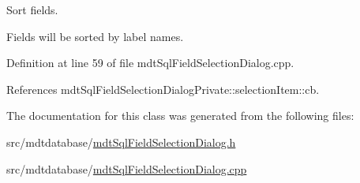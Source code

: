 Sort fields. 

Fields will be sorted by label names. 

Definition at line 59 of file mdt\-Sql\-Field\-Selection\-Dialog.\-cpp.



References mdt\-Sql\-Field\-Selection\-Dialog\-Private\-::selection\-Item\-::cb.



The documentation for this class was generated from the following files\-:\begin{DoxyCompactItemize}
\item 
src/mdtdatabase/\hyperlink{mdt_sql_field_selection_dialog_8h}{mdt\-Sql\-Field\-Selection\-Dialog.\-h}\item 
src/mdtdatabase/\hyperlink{mdt_sql_field_selection_dialog_8cpp}{mdt\-Sql\-Field\-Selection\-Dialog.\-cpp}\end{DoxyCompactItemize}
